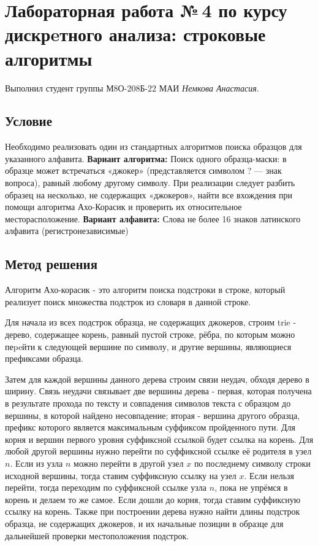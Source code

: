 \documentclass[12pt]{article}
\begin{document}
\section*{Лабораторная работа №\,4 по курсу дискрeтного анализа: строковые алгоритмы}

Выполнил студент группы М8О-208Б-22 МАИ \textit{Немкова Анастасия}.

\subsection*{Условие}
Необходимо реализовать один из стандартных алгоритмов поиска образцов для указанного алфавита.\newline
\newline
\textbf{Вариант алгоритма:}
Поиск одного образца-маски: в образце может встречаться «джокер» (представляется символом ? — знак вопроса), равный любому другому символу. При реализации следует разбить образец на несколько, не содержащих «джокеров», найти все вхождения при помощи алгоритма Ахо-Корасик и проверить их относительное месторасположение.\newline
\newline
\textbf{Вариант алфавита:}
Слова не более 16 знаков латинского алфавита (регистронезависимые)


\subsection*{Метод решения}

Алгоритм Ахо-корасик - это алгоритм поиска подстроки в строке, который реализует поиск множества подстрок из словаря в данной строке.

Для начала из всех подстрок образца, не содержащих джокеров, строим trie - дерево, содержащее корень, равный пустой строке, рёбра, по которым можно пеpeйти к следующей вершине по символу, и другие вершины, являющиеся префиксами образца. 

Затем для каждой вершины данного дерева строим связи неудач, обходя дерево в ширину. Связь неудачи связывает две вершины дерева - первая, которая получена в результате прохода по тексту и совпадения символов текста с образцом до вершины, в которой найдено несовпадение; вторая - вершина другого образца, префикс которого является максимальным суффиксом пройденного пути. Для корня и вершин первого уровня суффиксной ссылкой будет ссылка на корень. Для любой другой вершины
нужно перейти по суффиксной ссылке её родителя в узел $n$. Если из узла $n$ можно перейти в другой узел $x$ по последнему символу
строки исходной вершины, тогда ставим суффиксную ссылку на узел $x$. Если нельзя перейти, тогда переходим по суффиксной ссылке
узла $n$, пока не упрёмся в корень и делаем то же самое. Если дошли до корня, тогда ставим суффиксную ссылку на корень. Также при построении дерева нужно найти длины подстрок образца, не содержащих джокеров, и их начальные позиции в образце для дальнейшей проверки местоположения подстрок.
\end{document}

